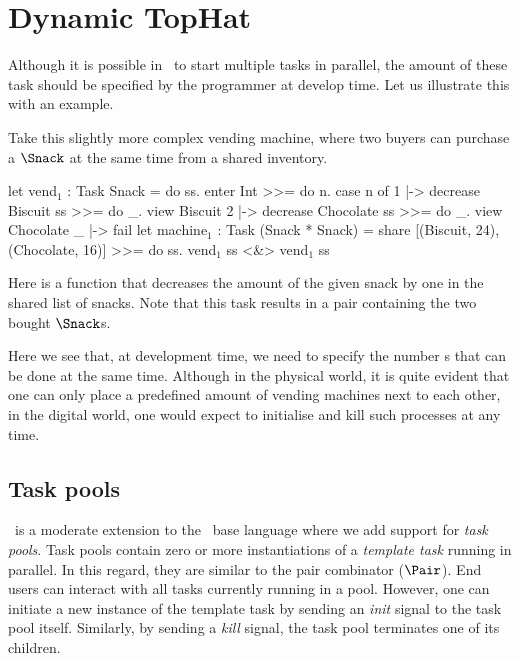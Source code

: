 
\section{Dynamic TopHat}
\label{sec:dyntophat}


Although it is possible in \TOPHAT\ to start multiple tasks in parallel,
the amount of these task should be specified by the programmer at develop time.
Let us illustrate this with an example.

\begin{example}
  \label{exm:vending-shared}
  Take this slightly more complex vending machine,
  where two buyers can purchase a $\Snack$ at the same time from a shared inventory.

  \begin{TASK}[]
    let vend$_1$ : Task Snack = do ss.
      enter Int >>= do n.
      case n of
        1 |-> decrease Biscuit ss >>= do _.
             view Biscuit
        2 |-> decrease Chocolate ss >>= do _.
             view Chocolate
        _ |-> fail
    let machine$_1$ : Task (Snack * Snack) =
      share [(Biscuit, 24), (Chocolate, 16)] >>= do ss.
      vend$_1$ ss <&> vend$_1$ ss
  \end{TASK}

  Here  is a function that decreases the amount of the given snack by one in the shared list of snacks.
  Note that this task results in a pair containing the two bought $\Snack$s.
\end{example}

Here we see that, at development time, we need to specify the number s that can be done at the same time.
Although in the physical world, it is quite evident that one can only place a predefined amount of vending machines next to each other,
in the digital world, one would expect to initialise and kill such processes at any time.

\subsection{Task pools}

\DYNTOPHAT\ is a moderate extension to the \TOPHAT\ base language where we add support for \emph{task pools}.
Task pools contain zero or more instantiations of a \emph{template task} running in parallel.
In this regard, they are similar to the pair combinator ($\Pair$).
End users can interact with all tasks currently running in a pool.
However, one can initiate a new instance of the template task by sending an \emph{init} signal to the task pool itself.
Similarly, by sending a \emph{kill} signal, the task pool terminates one of its children.

